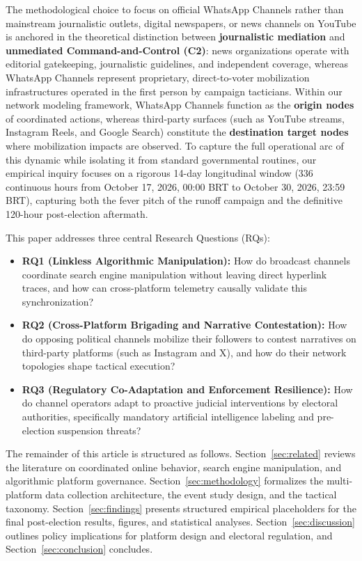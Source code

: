 \documentclass[preprint,12pt]{elsarticle}
\begin{document}
The methodological choice to focus on official WhatsApp Channels rather than mainstream journalistic outlets, digital newspapers, or news channels on YouTube is anchored in the theoretical distinction between \textbf{journalistic mediation} and \textbf{unmediated Command-and-Control (C2)}: news organizations operate with editorial gatekeeping, journalistic guidelines, and independent coverage, whereas WhatsApp Channels represent proprietary, direct-to-voter mobilization infrastructures operated in the first person by campaign tacticians. Within our network modeling framework, WhatsApp Channels function as the \textbf{origin nodes} of coordinated actions, whereas third-party surfaces (such as YouTube streams, Instagram Reels, and Google Search) constitute the \textbf{destination target nodes} where mobilization impacts are observed. To capture the full operational arc of this dynamic while isolating it from standard governmental routines, our empirical inquiry focuses on a rigorous 14-day longitudinal window ($336$ continuous hours from October 17, 2026, 00:00 BRT to October 30, 2026, 23:59 BRT), capturing both the fever pitch of the runoff campaign and the definitive 120-hour post-election aftermath.

This paper addresses three central Research Questions (RQs):
\begin{itemize}
    \item \textbf{RQ1 (Linkless Algorithmic Manipulation):} How do broadcast channels coordinate search engine manipulation without leaving direct hyperlink traces, and how can cross-platform telemetry causally validate this synchronization?
    \item \textbf{RQ2 (Cross-Platform Brigading and Narrative Contestation):} How do opposing political channels mobilize their followers to contest narratives on third-party platforms (such as Instagram and X), and how do their network topologies shape tactical execution?
    \item \textbf{RQ3 (Regulatory Co-Adaptation and Enforcement Resilience):} How do channel operators adapt to proactive judicial interventions by electoral authorities, specifically mandatory artificial intelligence labeling and pre-election suspension threats?
\end{itemize}

The remainder of this article is structured as follows. Section~\ref{sec:related} reviews the literature on coordinated online behavior, search engine manipulation, and algorithmic platform governance. Section~\ref{sec:methodology} formalizes the multi-platform data collection architecture, the event study design, and the tactical taxonomy. Section~\ref{sec:findings} presents structured empirical placeholders for the final post-election results, figures, and statistical analyses. Section~\ref{sec:discussion} outlines policy implications for platform design and electoral regulation, and Section~\ref{sec:conclusion} concludes.
\end{document}
